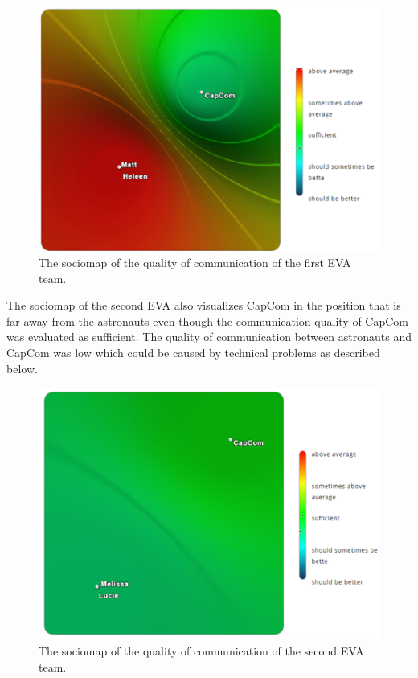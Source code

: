 \documentclass[preprint]{elsarticle}
\begin{document}
\begin{figure}
\centering
\includegraphics{img/figure15.png}
\caption{The sociomap of the quality of communication of the first EVA team.}
\end{figure}

The sociomap of the second EVA also visualizes CapCom in the position that is far away from the astronauts even though the communication quality of CapCom was evaluated as sufficient. The quality of communication between astronauts and CapCom was low which could be caused by technical problems as described below.

\begin{figure}
\centering
\includegraphics{img/figure16.png}
\caption{The sociomap of the quality of communication of the second EVA team.}
\end{figure}
\end{document}
